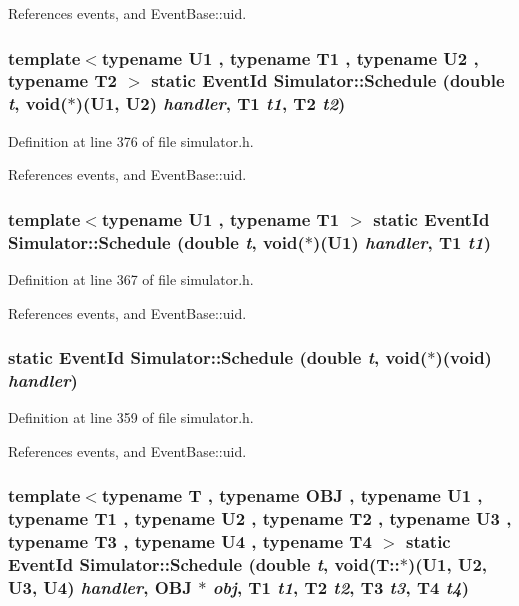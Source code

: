References events, and EventBase::uid.
\subsubsection[{Schedule}]{\setlength{\rightskip}{0pt plus 5cm}template$<$typename U1 , typename T1 , typename U2 , typename T2 $>$ static {\bf EventId} Simulator::Schedule (double {\em t}, \/  void($\ast$)(U1, U2) {\em handler}, \/  T1 {\em t1}, \/  T2 {\em t2})\hspace{0.3cm}{\tt  [inline, static]}}\label{classSimulator_612e0d3f87f3461aa116ca3552adf11a}




Definition at line 376 of file simulator.h.

References events, and EventBase::uid.
\subsubsection[{Schedule}]{\setlength{\rightskip}{0pt plus 5cm}template$<$typename U1 , typename T1 $>$ static {\bf EventId} Simulator::Schedule (double {\em t}, \/  void($\ast$)(U1) {\em handler}, \/  T1 {\em t1})\hspace{0.3cm}{\tt  [inline, static]}}\label{classSimulator_e76c104f5cfd844df6054a3c7956a098}




Definition at line 367 of file simulator.h.

References events, and EventBase::uid.
\subsubsection[{Schedule}]{\setlength{\rightskip}{0pt plus 5cm}static {\bf EventId} Simulator::Schedule (double {\em t}, \/  void($\ast$)(void) {\em handler})\hspace{0.3cm}{\tt  [inline, static]}}\label{classSimulator_e5e8a4479b8e2a7b4ecdb3eb8561b960}




Definition at line 359 of file simulator.h.

References events, and EventBase::uid.
\subsubsection[{Schedule}]{\setlength{\rightskip}{0pt plus 5cm}template$<$typename T , typename OBJ , typename U1 , typename T1 , typename U2 , typename T2 , typename U3 , typename T3 , typename U4 , typename T4 $>$ static {\bf EventId} Simulator::Schedule (double {\em t}, \/  void(T::$\ast$)(U1, U2, U3, U4) {\em handler}, \/  OBJ $\ast$ {\em obj}, \/  T1 {\em t1}, \/  T2 {\em t2}, \/  T3 {\em t3}, \/  T4 {\em t4})\hspace{0.3cm}{\tt  [inline, static]}}\label{classSimulator_6846b3f0aa16ad7b4a4a1653837c123a}




